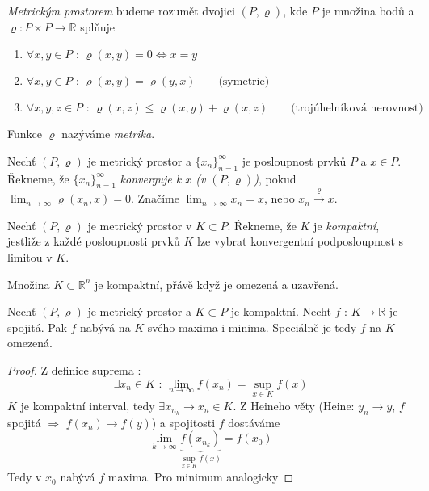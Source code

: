 \begin{definice}
\emph{Metrickým prostorem} budeme rozumět dvojici $(P, \varrho)$, kde $P$ je množina bodů a $\varrho : P \times P \rightarrow \mathbb{R}$ splňuje 

\begin{enumerate}
\item $\forall x,y \in P \textrm{ : } \varrho(x,y) = 0 \Leftrightarrow x = y$
\item $\forall x,y \in P \textrm{ : } \varrho(x,y) = \varrho(y,x) \qquad \textrm{(symetrie)}$
\item $\forall x,y,z \in P \textrm{ : } \varrho(x,z) \leq \varrho(x,y) + \varrho(x,z) \qquad \textrm{(trojúhelníková nerovnost)}$
\end{enumerate}
Funkce $\varrho$ nazýváme \emph{metrika}.
\end{definice}

\begin{definice}
Nechť $(P, \varrho)$ je metrický prostor a $\{ x_n \}_{n=1}^\infty$ je posloupnost prvků $P$ a $x \in P$. Řekneme, že $\{ x_n \}_{n=1}^{\infty}$ \emph{konverguje k $x$ (v $(P, \varrho)$)}, pokud $\lim_{n \rightarrow \infty} \varrho(x_n, x) = 0$. Značíme $\lim_{n \rightarrow \infty} x_n = x$, nebo $x_n \overset{\varrho}{\rightarrow} x$.
\end{definice}

\begin{definice}
Nechť $(P, \varrho)$ je metrický prostor v $K \subset P$. Řekneme, že $K$ je \emph{kompaktní}, jestliže z každé posloupnosti prvků $K$ lze vybrat konvergentní podposloupnost s limitou v $K$.
\end{definice}

\begin{vetabd}
Množina $K \subset \mathbb{R}^n$ je kompaktní, přávě když je omezená a uzavřená.
\end{vetabd}

\begin{vetal}
Nechť $(P, \varrho)$ je metrický prostor a $K \subset P$ je kompaktní. Nechť $f \textrm{ : } K \rightarrow \mathbb{R}$ je spojitá. Pak $f$ nabývá na $K$ svého maxima i minima. Speciálně je tedy $f$ na $K$ omezená.
\end{vetal}

\begin{proof}
Z definice suprema :
$$\exists x_n \in K \textrm { : } \lim_{n \to \infty} f(x_n) = \sup_{x \in K} f(x)$$
$K$ je kompaktní interval, tedy $\exists x_{n_k} \to x_n \in K$. Z Heineho věty (Heine: $y_n \to y$, $f$ spojitá $\Rightarrow$ $f(x_n) \to f(y)$) a spojitosti $f$ dostáváme 
$$\lim_{k \to \infty} \underbrace{f(x_{n_k})}_{\sup_{x \in K} f(x)} = f(x_0)$$
Tedy v $x_0$ nabývá $f$ maxima. Pro minimum analogicky
\end{proof}

